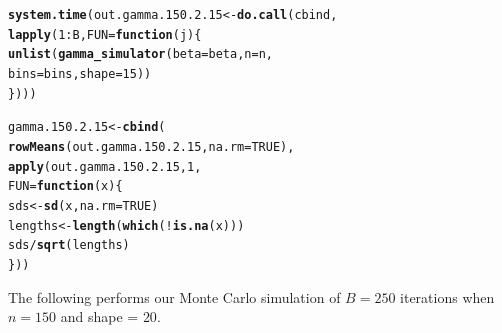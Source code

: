 \documentclass[11pt]{article}\usepackage[]{graphicx}\usepackage[]{color}
\makeatletter
\newcommand{\hlnum}[1]{\textcolor[rgb]{0.686,0.059,0.569}{#1}}%
\newcommand{\hlopt}[1]{\textcolor[rgb]{0,0,0}{#1}}%
\newcommand{\hlstd}[1]{\textcolor[rgb]{0.345,0.345,0.345}{#1}}%
\newcommand{\hlkwa}[1]{\textcolor[rgb]{0.161,0.373,0.58}{\textbf{#1}}}%
\newcommand{\hlkwb}[1]{\textcolor[rgb]{0.69,0.353,0.396}{#1}}%
\newcommand{\hlkwc}[1]{\textcolor[rgb]{0.333,0.667,0.333}{#1}}%
\newcommand{\hlkwd}[1]{\textcolor[rgb]{0.737,0.353,0.396}{\textbf{#1}}}%
\newenvironment{kframe}{%
 \def\at@end@of@kframe{}%
 \ifinner\ifhmode%
  \def\at@end@of@kframe{\end{minipage}}%
  \begin{minipage}{\columnwidth}%
 \fi\fi%
 \def\FrameCommand##1{\hskip\@totalleftmargin \hskip-\fboxsep
 \colorbox{shadecolor}{##1}\hskip-\fboxsep
     \hskip-\linewidth \hskip-\@totalleftmargin \hskip\columnwidth}%
 \MakeFramed {\advance\hsize-\width
   \@totalleftmargin\z@ \linewidth\hsize
   \@setminipage}}%
 {\par\unskip\endMakeFramed%
 \at@end@of@kframe}
\newenvironment{knitrout}{}{} %
\makeatother
\begin{document}
\begin{knitrout}
\color{fgcolor}\begin{kframe}
\begin{alltt}
\hlkwd{system.time}\hlstd{(out.gamma.150.2.15} \hlkwb{<-} \hlkwd{do.call}\hlstd{(cbind,}
  \hlkwd{lapply}\hlstd{(}\hlnum{1}\hlopt{:}\hlstd{B,} \hlkwc{FUN} \hlstd{=} \hlkwa{function}\hlstd{(}\hlkwc{j}\hlstd{)\{}
    \hlkwd{unlist}\hlstd{(}\hlkwd{gamma_simulator}\hlstd{(}\hlkwc{beta} \hlstd{= beta,} \hlkwc{n} \hlstd{= n,}
      \hlkwc{bins} \hlstd{= bins,} \hlkwc{shape} \hlstd{=} \hlnum{15}\hlstd{))}
\hlstd{\})))}
\end{alltt}


{\ttfamily\noindent\bfseries\color{errorcolor}{\#\# Error in eval(family\$initialize): non-positive values not allowed for the 'gamma' family}}

{\ttfamily\noindent\itshape\color{messagecolor}{\#\# Timing stopped at: 0.002 0 0.003}}\end{kframe}
\end{knitrout}

\begin{knitrout}
\color{fgcolor}\begin{kframe}
\begin{alltt}
\hlstd{gamma.150.2.15} \hlkwb{<-} \hlkwd{cbind}\hlstd{(}
  \hlkwd{rowMeans}\hlstd{(out.gamma.150.2.15,} \hlkwc{na.rm} \hlstd{=} \hlnum{TRUE}\hlstd{),}
  \hlkwd{apply}\hlstd{(out.gamma.150.2.15,} \hlnum{1}\hlstd{,}
  \hlkwc{FUN} \hlstd{=} \hlkwa{function}\hlstd{(}\hlkwc{x}\hlstd{)\{}
    \hlstd{sds} \hlkwb{<-} \hlkwd{sd}\hlstd{(x,} \hlkwc{na.rm} \hlstd{=} \hlnum{TRUE}\hlstd{)}
    \hlstd{lengths} \hlkwb{<-} \hlkwd{length}\hlstd{(}\hlkwd{which}\hlstd{(}\hlopt{!}\hlkwd{is.na}\hlstd{(x)))}
    \hlstd{sds} \hlopt{/} \hlkwd{sqrt}\hlstd{(lengths)}
  \hlstd{\}))}
\end{alltt}


{\ttfamily\noindent\bfseries\color{errorcolor}{\#\# Error in is.data.frame(x): object 'out.gamma.150.2.15' not found}}\end{kframe}
\end{knitrout}

The following performs our Monte Carlo simulation of $B = 250$ iterations 
when $n = 150$ and shape = $20$.
\end{document}
